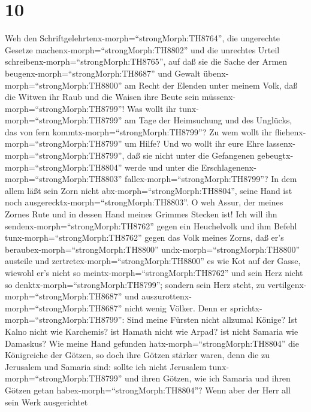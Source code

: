 \hypertarget{section-9}{%
\section{10}\label{section-9}}

 Weh den Schriftgelehrtenx-morph=``strongMorph:TH8764'', die
ungerechte Gesetze machenx-morph=``strongMorph:TH8802'' und die
unrechtes Urteil schreibenx-morph=``strongMorph:TH8765'', 
auf daß sie die Sache der Armen beugenx-morph=``strongMorph:TH8687'' und
Gewalt übenx-morph=``strongMorph:TH8800'' am Recht der Elenden unter
meinem Volk, daß die Witwen ihr Raub und die Waisen ihre Beute sein
müssenx-morph=``strongMorph:TH8799''!  Was wollt ihr
tunx-morph=``strongMorph:TH8799'' am Tage der Heimsuchung und des
Unglücks, das von fern kommtx-morph=``strongMorph:TH8799''? Zu wem wollt
ihr fliehenx-morph=``strongMorph:TH8799'' um Hilfe? Und wo wollt ihr
eure Ehre lassenx-morph=``strongMorph:TH8799'',  daß sie
nicht unter die Gefangenen gebeugtx-morph=``strongMorph:TH8804'' werde
und unter die Erschlagenenx-morph=``strongMorph:TH8803''
fallex-morph=``strongMorph:TH8799''? In dem allem läßt sein Zorn nicht
abx-morph=``strongMorph:TH8804'', seine Hand ist noch
ausgerecktx-morph=``strongMorph:TH8803''.  O weh Assur, der
meines Zornes Rute und in dessen Hand meines Grimmes Stecken ist!
 Ich will ihn sendenx-morph=``strongMorph:TH8762'' gegen ein
Heuchelvolk und ihm Befehl tunx-morph=``strongMorph:TH8762'' gegen das
Volk meines Zorns, daß er's beraubex-morph=``strongMorph:TH8800''
undx-morph=``strongMorph:TH8800'' austeile und
zertretex-morph=``strongMorph:TH8800'' es wie Kot auf der Gasse,
 wiewohl er's nicht so meintx-morph=``strongMorph:TH8762''
und sein Herz nicht so denktx-morph=``strongMorph:TH8799''; sondern sein
Herz steht, zu vertilgenx-morph=``strongMorph:TH8687'' und
auszurottenx-morph=``strongMorph:TH8687'' nicht wenig Völker.
 Denn er sprichtx-morph=``strongMorph:TH8799'': Sind meine
Fürsten nicht allzumal Könige?  Ist Kalno nicht wie
Karchemis? ist Hamath nicht wie Arpad? ist nicht Samaria wie Damaskus?
 Wie meine Hand gefunden hatx-morph=``strongMorph:TH8804''
die Königreiche der Götzen, so doch ihre Götzen stärker waren, denn die
zu Jerusalem und Samaria sind:  sollte ich nicht Jerusalem
tunx-morph=``strongMorph:TH8799'' und ihren Götzen, wie ich Samaria und
ihren Götzen getan habex-morph=``strongMorph:TH8804''? 
Wenn aber der Herr all sein Werk ausgerichtet
